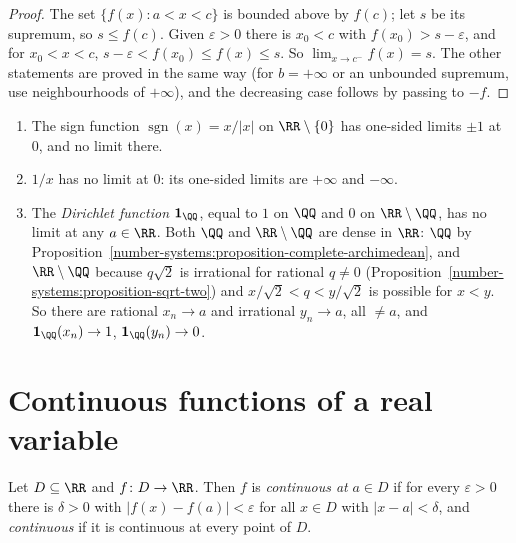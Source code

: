\begin{proof}
The set $\{f(x) : a < x < c\}$ is bounded above by $f(c)$; let $s$ be its supremum, so $s \leq f(c)$. Given $\varepsilon > 0$ there is $x_0 < c$ with $f(x_0) > s - \varepsilon$, and for $x_0 < x < c$,
$s - \varepsilon < f(x_0) \leq f(x) \leq s$. So $\lim_{x \to c^-}f(x) = s$. The other statements are proved in the same way (for $b = +\infty$ or an unbounded supremum, use neighbourhoods of $+\infty$), and the decreasing
case follows by passing to $-f$.
\end{proof}

\begin{counterexample}\label{real-analysis:counterexample-no-limit}
\begin{enumerate}
\item The sign function $\operatorname{sgn}(x) = x/|x|$ on $\RR \setminus \{0\}$ has one-sided limits $\pm1$ at $0$, and no limit there.
\item $1/x$ has no limit at $0$: its one-sided limits are $+\infty$ and $-\infty$.
\item The \emph{Dirichlet function} $\mathbf{1}_\QQ$, equal to $1$ on $\QQ$ and $0$ on $\RR \setminus \QQ$, has no limit at any $a \in \RR$. Both $\QQ$ and $\RR \setminus \QQ$ are dense in $\RR$: $\QQ$ by
Proposition~\ref{number-systems:proposition-complete-archimedean}, and $\RR \setminus \QQ$ because $q\sqrt2$ is irrational for rational $q \neq 0$ (Proposition~\ref{number-systems:proposition-sqrt-two}) and
$x/\sqrt2 < q < y/\sqrt2$ is possible for $x < y$. So there are rational $x_n \to a$ and irrational $y_n \to a$, all $\neq a$, and $\mathbf{1}_\QQ(x_n) \to 1$, $\mathbf{1}_\QQ(y_n) \to 0$.
\end{enumerate}
\end{counterexample}

\section{Continuous functions of a real variable}\label{real-analysis:section-continuity-real}

\begin{definition}\label{real-analysis:definition-continuity-real}
Let $D \subseteq \RR$ and $f \colon D \to \RR$. Then $f$ is \emph{continuous at} $a \in D$ if for every $\varepsilon > 0$ there is $\delta > 0$ with $|f(x) - f(a)| < \varepsilon$ for all $x \in D$ with
$|x - a| < \delta$, and \emph{continuous} if it is continuous at every point of $D$.
\end{definition}

